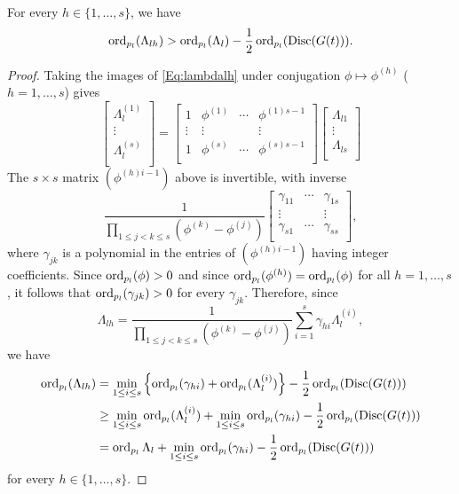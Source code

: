\begin{lemma}\label{Lem:discG}
For every $h \in \{1, \dots, s\}$, we have
\[\operatorname{ord}_{p_l}(\Lambda_{lh}) > \operatorname{ord}_{p_l}(\Lambda_l) - \frac{1}{2}\operatorname{ord}_{p_l}(\text{Disc}(G(t))).\]
\end{lemma}

\begin{proof}
Taking the images of \eqref{Eq:lambdalh} under conjugation $\phi \mapsto \phi^{(h)}$ ($h = 1, \dots, s$) gives
\[\begin{bmatrix}
\Lambda_l^{(1)} \\
\vdots \\
\Lambda_l^{(s)}	\\
\end{bmatrix}
=
\begin{bmatrix}
1 		& \phi^{(1)} 	& \cdots 	& \phi^{(1)s-1}\\
\vdots 	& \vdots 		& 		& \vdots \\
1 		& \phi^{(s)} 	& \cdots  	& \phi^{(s)s-1}\\
\end{bmatrix}
\begin{bmatrix}
\Lambda_{l1}\\
\vdots \\
\Lambda_{ls}\\
\end{bmatrix}\]
The $s \times s$ matrix $(\phi^{(h)i-1})$ above is invertible, with inverse
\[\frac{1}{\displaystyle \prod_{1\leq j<k\leq s} (\phi^{(k)} - \phi^{(j)})}
\begin{bmatrix}
\gamma_{11} 	& \cdots 	& \gamma_{1s}\\
\vdots 		& 		& \vdots\\
\gamma_{s1} 	& \cdots 	& \gamma_{ss}\\
\end{bmatrix},\]
where $\gamma_{jk}$ is a polynomial in the entries of $(\phi^{(h)i-1})$ having integer coefficients. Since $\operatorname{ord}_{p_l}(\phi) > 0$ and since $\operatorname{ord}_{p_l}(\phi^{(h)}) = \operatorname{ord}_{p_l}(\phi)$ for all $h = 1, \dots, s$, it follows that $\operatorname{ord}_{p_l}(\gamma_{jk}) > 0 $ for every $\gamma_{jk}$. Therefore, since 
\[\Lambda_{lh} = \frac{1}{\displaystyle \prod_{1\leq j<k\leq s}(\phi^{(k)} - \phi^{(j)})}\sum_{i = 1}^s \gamma_{hi}\Lambda_l^{(i)},\]
we have 
\[\begin{split}
\operatorname{ord}_{p_l}(\Lambda_{lh}) 
	& = \min_{1 \leq i \leq s} \left\{\operatorname{ord}_{p_l}(\gamma_{hi}) + \operatorname{ord}_{p_l}(\Lambda_l^{(i)})\right\} -\frac{1}{2}\operatorname{ord}_{p_l}(\text{Disc}(G(t)))\\
	& \geq \min_{1 \leq i \leq s} \operatorname{ord}_{p_l}(\Lambda_l^{(i)}) +  \min_{1 \leq i \leq s} \operatorname{ord}_{p_l}(\gamma_{hi}) - \frac{1}{2}\operatorname{ord}_{p_l}(\text{Disc}(G(t)))\\
	& = \operatorname{ord}_{p_l}\Lambda_l + \min_{1 \leq i \leq s} \operatorname{ord}_{p_l}(\gamma_{hi}) - \frac{1}{2}\operatorname{ord}_{p_l}(\text{Disc}(G(t)))
\end{split}\]
for every $h \in \{1, \dots, s\}$. 
\end{proof}

